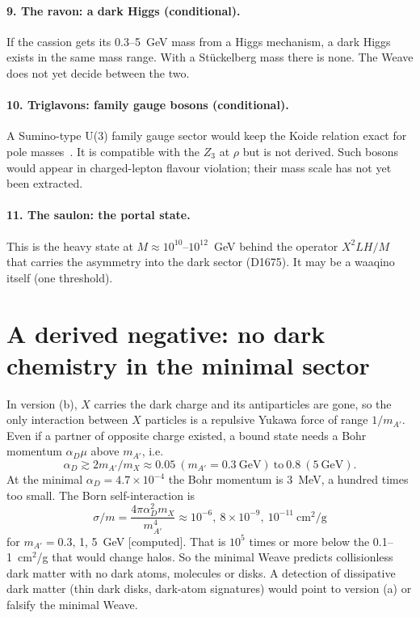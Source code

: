 \documentclass[aps,prd,twocolumn,superscriptaddress,nofootinbib,showkeys]{revtex4-2}
\begin{document}
\paragraph*{9. The ravon: a dark Higgs (conditional).} If the cassion gets its 0.3--5~GeV mass from a Higgs mechanism, a dark Higgs exists in the same mass range. With a St\"uckelberg mass there is none. The Weave does not yet decide between the two.
\paragraph*{10. Triglavons: family gauge bosons (conditional).} A Sumino-type U(3) family gauge sector would keep the Koide relation exact for pole masses~\cite{SUM}. It is compatible with the $Z_3$ at $\rho$ but is not derived. Such bosons would appear in charged-lepton flavour violation; their mass scale has not yet been extracted.
\paragraph*{11. The saulon: the portal state.} This is the heavy state at $M\approx10^{10}$--$10^{12}$~GeV behind the operator $X^2LH/M$ that carries the asymmetry into the dark sector (D1675). It may be a waaqino itself (one threshold).

\section{A derived negative: no dark chemistry in the minimal sector}
In version (b), $X$ carries the dark charge and its antiparticles are gone, so the only interaction between $X$ particles is a repulsive Yukawa force of range $1/m_{A'}$. Even if a partner of opposite charge existed, a bound state needs a Bohr momentum $\alpha_D\mu$ above $m_{A'}$, i.e.
\begin{equation}
\alpha_D\gtrsim 2m_{A'}/m_X\approx0.05~(m_{A'}=0.3~\mathrm{GeV})\ \text{to}\ 0.8~(5~\mathrm{GeV}).
\end{equation}
At the minimal $\alpha_D=4.7\times10^{-4}$ the Bohr momentum is 3~MeV, a hundred times too small. The Born self-interaction is
\begin{equation}
\sigma/m=\frac{4\pi\alpha_D^2m_X}{m_{A'}^4}\approx10^{-6},\ 8\times10^{-9},\ 10^{-11}~\mathrm{cm^2/g}
\end{equation}
for $m_{A'}=0.3$, 1, 5~GeV [computed]. That is $10^5$ times or more below the 0.1--1~cm$^2$/g that would change halos. So the minimal Weave predicts collisionless dark matter with no dark atoms, molecules or disks. A detection of dissipative dark matter (thin dark disks, dark-atom signatures) would point to version (a) or falsify the minimal Weave.
\end{document}

